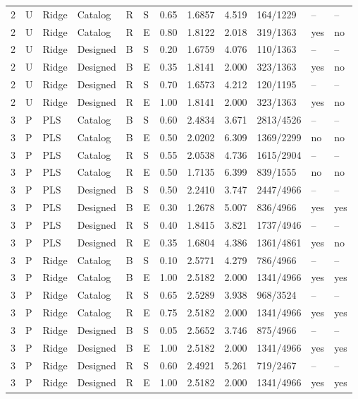 \documentclass[10pt,a4paper]{article}
\begin{document}
\begin{longtable}{rlllllrrrlll}
2 & U & Ridge & Catalog & R & S & 0.65 & 1.6857 & 4.519 & 164/1229 & -- & -- \\
2 & U & Ridge & Catalog & R & E & 0.80 & 1.8122 & 2.018 & 319/1363 & yes & no \\
2 & U & Ridge & Designed & B & S & 0.20 & 1.6759 & 4.076 & 110/1363 & -- & -- \\
2 & U & Ridge & Designed & B & E & 0.35 & 1.8141 & 2.000 & 323/1363 & yes & no \\
2 & U & Ridge & Designed & R & S & 0.70 & 1.6573 & 4.212 & 120/1195 & -- & -- \\
2 & U & Ridge & Designed & R & E & 1.00 & 1.8141 & 2.000 & 323/1363 & yes & no \\
3 & P & PLS & Catalog & B & S & 0.60 & 2.4834 & 3.671 & 2813/4526 & -- & -- \\
3 & P & PLS & Catalog & B & E & 0.50 & 2.0202 & 6.309 & 1369/2299 & no & no \\
3 & P & PLS & Catalog & R & S & 0.55 & 2.0538 & 4.736 & 1615/2904 & -- & -- \\
3 & P & PLS & Catalog & R & E & 0.50 & 1.7135 & 6.399 & 839/1555 & no & no \\
3 & P & PLS & Designed & B & S & 0.50 & 2.2410 & 3.747 & 2447/4966 & -- & -- \\
3 & P & PLS & Designed & B & E & 0.30 & 1.2678 & 5.007 & 836/4966 & yes & yes \\
3 & P & PLS & Designed & R & S & 0.40 & 1.8415 & 3.821 & 1737/4946 & -- & -- \\
3 & P & PLS & Designed & R & E & 0.35 & 1.6804 & 4.386 & 1361/4861 & yes & no \\
3 & P & Ridge & Catalog & B & S & 0.10 & 2.5771 & 4.279 & 786/4966 & -- & -- \\
3 & P & Ridge & Catalog & B & E & 1.00 & 2.5182 & 2.000 & 1341/4966 & yes & yes \\
3 & P & Ridge & Catalog & R & S & 0.65 & 2.5289 & 3.938 & 968/3524 & -- & -- \\
3 & P & Ridge & Catalog & R & E & 0.75 & 2.5182 & 2.000 & 1341/4966 & yes & yes \\
3 & P & Ridge & Designed & B & S & 0.05 & 2.5652 & 3.746 & 875/4966 & -- & -- \\
3 & P & Ridge & Designed & B & E & 1.00 & 2.5182 & 2.000 & 1341/4966 & yes & yes \\
3 & P & Ridge & Designed & R & S & 0.60 & 2.4921 & 5.261 & 719/2467 & -- & -- \\
3 & P & Ridge & Designed & R & E & 1.00 & 2.5182 & 2.000 & 1341/4966 & yes & yes \\

\end{longtable}
\end{document}
